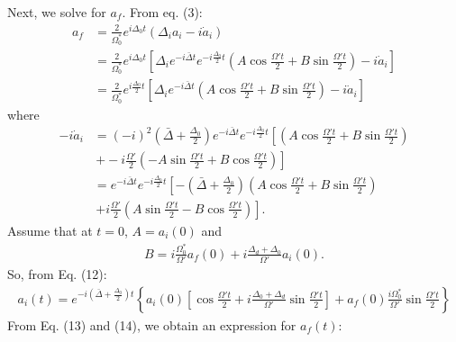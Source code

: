 \documentclass{article}
\begin{document}
Next, we solve for $a_f$. From eq. (3):
\begin{align}
a_f &= \frac{2}{\Omega^*_0}e^{i\Delta_0t} \left(\Delta_ia_i - i\dot{a}_i \right) \nonumber\\
&= \frac{2}{\Omega^*_0}e^{i\Delta_0t}\left[\Delta_i e^{-i\bar{\Delta}t}e^{-i\frac{\Delta_0}{2}t}\left(A\cos\frac{\Omega't}{2} + B\sin\frac{\Omega't}{2} \right)  - i\dot{a}_i\right]\nonumber\\
&=\frac{2}{\Omega^*_0}e^{i\frac{\Delta_0}{2}t}\left[\Delta_i e^{-i\bar{\Delta}t}\left(A\cos\frac{\Omega't}{2} + B\sin\frac{\Omega't}{2} \right)  - i\dot{a}_i\right]
\end{align}
where 
\begin{align}
-i\dot{a}_i &= (-i)^2\left(\bar{\Delta} + \frac{\Delta_0}{2} \right)e^{-i\bar{\Delta}t}e^{-i\frac{\Delta_0}{2}t}\left[\left(A\cos\frac{\Omega't}{2} + B\sin\frac{\Omega't}{2} \right)\right.\nonumber\\&{\,}\left.+ -i\frac{\Omega'}{2}\left(-A\sin\frac{\Omega't}{2} + B\cos\frac{\Omega't}{2} \right)\right]\nonumber\\
&= e^{-i\bar{\Delta}t}e^{-i\frac{\Delta_0}{2}t}\left[-\left(\bar{\Delta} + \frac{\Delta_0}{2}\right)\left(A\cos\frac{\Omega't}{2} + B\sin\frac{\Omega't}{2} \right)\right. \nonumber\\
&{\,} \left.+ i\frac{\Omega'}{2}\left(A\sin\frac{\Omega't}{2} - B\cos\frac{\Omega't}{2} \right) \right].
\end{align}
Assume that at $t = 0$, $A = a_i(0)$ and 
\begin{align}
B = i\frac{\Omega^*_0}{\Omega'}a_f(0) + i\frac{\Delta_d + \Delta_0}{\Omega'}a_i(0).
\end{align}
So, from Eq. (12):
\begin{align}
\boxed{a_i(t) = e^{-i\left(\bar{\Delta} + \frac{\Delta_0}{2} \right)t }\left\{ a_i(0)\left[\cos\frac{\Omega't}{2} + i \frac{\Delta_0+\Delta_d}{\Omega'} \sin\frac{\Omega't}{2}\right] +a_f(0)\frac{i\Omega^*_0}{\Omega'}\sin\frac{\Omega't}{2} \right\}}
\end{align}
From Eq. (13) and (14), we obtain an expression for $a_f(t)$:
\end{document}
